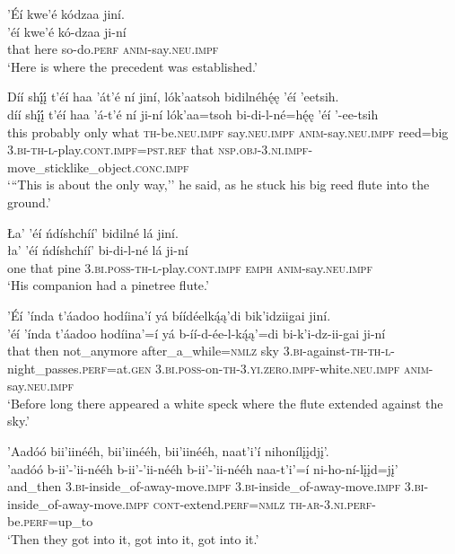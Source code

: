 \ea\label{ex:text4-3-10}
’Éí kwe’é kódzaa jiní.\\
\gll ’éí	kwe’é	kó-dzaa	ji-ní\\
     that	here	so-do.\textsc{perf}	\textsc{anim}-say.\textsc{neu}.\textsc{impf}\\
\glt `Here is where the precedent was established.'
\z

\ea\label{ex:text4-3-11}
Díí shį́į́ t’éí haa ’át’é ní jiní, lók’aatsoh bidilnéhę́ę ’éí ’eetsih.\\
\gll díí	shį́į́	t’éí	haa	’á-t’é	ní	ji-ní	lók’aa=tsoh	bi-di-l-né=hę́ę	’éí	’-ee-tsih\\
     this	probably	only	what	\textsc{th}-be.\textsc{neu}.\textsc{impf}	say.\textsc{neu}.\textsc{impf}	\textsc{anim}-say.\textsc{neu}.\textsc{impf}	reed=big	3.\textsc{bi}-\textsc{th}-\textsc{l}-play.\textsc{cont}.\textsc{impf}=\textsc{pst}.\textsc{ref}	that	\textsc{nsp}.\textsc{obj}-3.\textsc{ni}.\textsc{impf}-move\_sticklike\_object.\textsc{conc}.\textsc{impf}\\
\glt `{``}This is about the only way,'' he said, as he stuck his big reed flute into the ground.'
\z

\ea\label{ex:text4-3-12}
Ła’ ’éí ńdíshchíí’ bidilné lá jiní.\\
\gll ła’	’éí	ńdíshchíí’	bi-di-l-né	lá	ji-ní\\
     one	that	pine	3.\textsc{bi}.\textsc{poss}-\textsc{th}-\textsc{l}-play.\textsc{cont}.\textsc{impf}	\textsc{emph}	\textsc{anim}-say.\textsc{neu}.\textsc{impf}\\
\glt `His companion had a pinetree flute.'
\z

\newpage
\ea\label{ex:text4-3-13}
’Éí ’índa t’áadoo hodíina’í yá bíídéelką́ą’di bik’idziigai jiní.\\
\gll ’éí	’índa	t’áadoo	hodíina’=í	yá	b-íí-d-ée-l-ką́ą’=di	bi-k’i-dz-ii-gai	ji-ní\\
     that	then	not\_anymore	after\_a\_while=\textsc{nmlz}	sky	3.\textsc{bi}-against-\textsc{th}-\textsc{th}-\textsc{l}-night\_passes.\textsc{perf}=at.\textsc{gen}	3.\textsc{bi}.\textsc{poss}-on-\textsc{th}-3.\textsc{yi}.\textsc{zero}.\textsc{impf}-white.\textsc{neu}.\textsc{impf}	\textsc{anim}-say.\textsc{neu}.\textsc{impf}\\
\glt `Before long there appeared a white speck where the flute extended against the sky.'
\z

\ea\label{ex:text4-3-14}
’Aadóó bii’iinééh, bii’iinééh, bii’iinééh, naat’i’í nihonílįįdjį’.\\
\gll ’aadóó	b-ii’-’ii-nééh	b-ii’-’ii-nééh	b-ii’-’ii-nééh	naa-t’i’=í	ni-ho-ní-lįįd=jį’\\
     and\_then	3.\textsc{bi}-inside\_of-away-move.\textsc{impf}	3.\textsc{bi}-inside\_of-away-move.\textsc{impf}	3.\textsc{bi}-inside\_of-away-move.\textsc{impf}	\textsc{cont}-extend.\textsc{perf}=\textsc{nmlz}	\textsc{th}-\textsc{ar}-3.\textsc{ni}.\textsc{perf}-be.\textsc{perf}=up\_to\\
\glt `Then they got into it, got into it, got into it.'
\z

